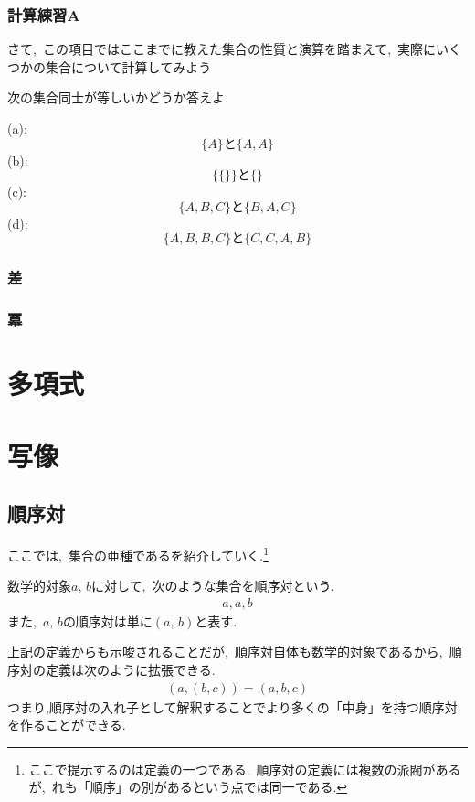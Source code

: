 \documentclass[hyperref,a4paper,12pt]{kininaruki}
\begin{document}
\subsubsection*{計算練習A}
さて,\, この項目ではここまでに教えた集合の性質と演算を踏まえて,\, 実際にいくつかの集合について計算してみよう
\begin{practice}{ 次の集合同士が等しいかどうか答えよ}
\begin{multicols}{2}
    \noindent
    (a):$$\{A\}\text{と}\{A,A\}$$
    \noindent
    (b):$$\{\{\}\}\text{と}\{\}$$
    \noindent
    (c):$$\{A,B,C\}\text{と}\{B,A,C\}$$
    \noindent
    (d):$$\{A,B,B,C\}\text{と}\{C,C,A,B\}$$
\end{multicols}
\end{practice}
\newpage
\subsubsection{差}
\newpage
\subsubsection{冪}
\newpage
\section{多項式}
\newpage
\section{写像}
\subsection{順序対}
ここでは,\, 集合の亜種であるを紹介していく.\footnote{%
ここで提示するのは定義の一つである.\, 順序対の定義には複数の派閥があるが,\, %
れも「順序」の別があるという点では同一である.}

\begin{shadebox}
    数学的対象$a,\, b$に対して,\, 次のような集合を順序対という.
    \begin{align}
        {a,{a,b}}
    \end{align}
    また,\, $a,\,b$の順序対は単に$(a,\, b)$と表す.
    \begin{boxnote}
        上記の定義からも示唆されることだが,\, 順序対自体も数学的対象であるから,\, %
        順序対の定義は次のように拡張できる.
        \begin{align}
            (a,(b,c)) = (a,b,c)
        \end{align}
        つまり,順序対の入れ子として解釈することでより多くの「中身」を持つ順序対を作ることができる.
    \end{boxnote}
\end{shadebox}
\end{document}
